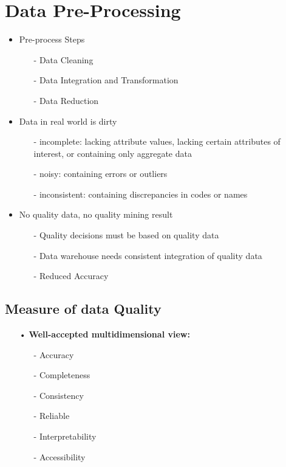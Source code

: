 \section{Data Pre-Processing}\label{sec:obj}
\begin{itemize}
\item Pre-process Steps
	\begin{itemize}
	\item[-] Data Cleaning
	\item[-] Data Integration and Transformation
	\item[-] Data Reduction
	\end{itemize}
\item Data in real world is dirty 
	\begin{itemize}
	\item[-]incomplete: lacking attribute values, lacking certain attributes of interest, or containing only aggregate data
	\item[-] noisy: containing errors or outliers
	\item[-] inconsistent: containing discrepancies in codes or names
    
	\end{itemize}
\item No quality data, no quality mining result
	\begin{itemize}
	\item[-] Quality decisions must be based on quality data
	\item[-] Data warehouse needs consistent integration of quality data
	\item[-] Reduced Accuracy
	\end{itemize}
\end{itemize}     
    
    
\newpage
\subsection{Measure of data Quality}
    \begin{itemize}
    \item[•] \textbf{Well-accepted multidimensional view:}
    \begin{itemize}
    \item[-] Accuracy
    \item[-] Completeness
    \item[-] Consistency
    \item[-] Reliable
    \item[-] Interpretability         
    \item[-] Accessibility
    \end{itemize}     
    \end{itemize}
    
